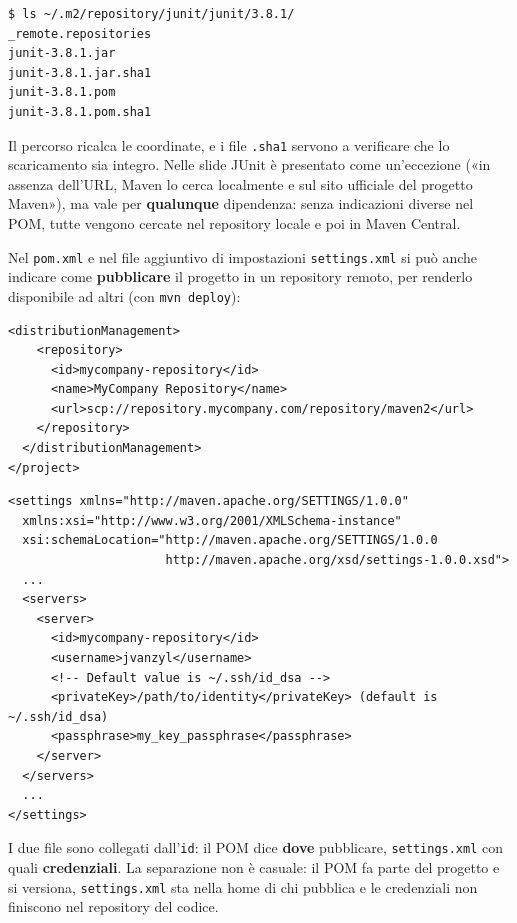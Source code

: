 \begin{lstlisting}[style=shell, name=Terminale]
$ ls ~/.m2/repository/junit/junit/3.8.1/
_remote.repositories
junit-3.8.1.jar
junit-3.8.1.jar.sha1
junit-3.8.1.pom
junit-3.8.1.pom.sha1
\end{lstlisting}

Il percorso ricalca le coordinate, e i file \texttt{.sha1} servono a verificare che lo scaricamento sia integro. Nelle
slide JUnit è presentato come un'eccezione («in assenza dell'URL, Maven lo cerca localmente e sul sito ufficiale del
progetto Maven»), ma vale per \textbf{qualunque} dipendenza: senza indicazioni diverse nel POM, tutte vengono cercate
nel repository locale e poi in Maven Central.

Nel \texttt{pom.xml} e nel file aggiuntivo di impostazioni \texttt{settings.xml} si può anche indicare come
\textbf{pubblicare} il progetto in un repository remoto, per renderlo disponibile ad altri (con \texttt{mvn deploy}):

\begin{lstlisting}[style=xml, name=pom.xml]
  <distributionManagement>
    <repository>
      <id>mycompany-repository</id>
      <name>MyCompany Repository</name>
      <url>scp://repository.mycompany.com/repository/maven2</url>
    </repository>
  </distributionManagement>
</project>
\end{lstlisting}

\begin{lstlisting}[style=xml, name=settings.xml]
<settings xmlns="http://maven.apache.org/SETTINGS/1.0.0"
  xmlns:xsi="http://www.w3.org/2001/XMLSchema-instance"
  xsi:schemaLocation="http://maven.apache.org/SETTINGS/1.0.0
                      http://maven.apache.org/xsd/settings-1.0.0.xsd">
  ...
  <servers>
    <server>
      <id>mycompany-repository</id>
      <username>jvanzyl</username>
      <!-- Default value is ~/.ssh/id_dsa -->
      <privateKey>/path/to/identity</privateKey> (default is ~/.ssh/id_dsa)
      <passphrase>my_key_passphrase</passphrase>
    </server>
  </servers>
  ...
</settings>
\end{lstlisting}

I due file sono collegati dall'\texttt{id}: il POM dice \textbf{dove} pubblicare, \texttt{settings.xml} con quali
\textbf{credenziali}. La separazione non è casuale: il POM fa parte del progetto e si versiona, \texttt{settings.xml}
sta nella home di chi pubblica e le credenziali non finiscono nel repository del codice.

